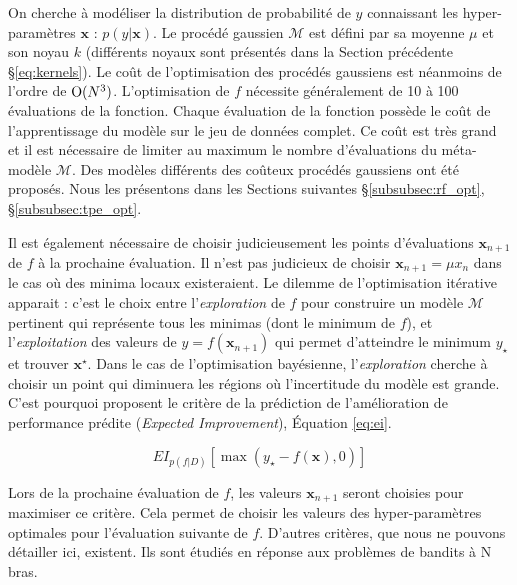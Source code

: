 On cherche à modéliser la distribution de probabilité de $y$ connaissant les hyper-paramètres $\boldsymbol{x}$ : $p(y | \boldsymbol{x})$.
Le procédé gaussien $\mathcal{M}$ est défini par sa moyenne $\mu$ et son noyau $k$ (différents noyaux sont présentés dans la Section précédente §\ref{eq:kernels}).
Le coût de l'optimisation des procédés gaussiens est néanmoins de l'ordre de $\operatorname{O}(N^3)$.
L'optimisation de $f$ nécessite généralement de 10 à 100 évaluations de la fonction.
Chaque évaluation de la fonction possède le coût de l'apprentissage du modèle sur le jeu de données complet.
Ce coût est très grand et il est nécessaire de limiter au maximum le nombre d'évaluations du méta-modèle $\mathcal{M}$.
Des modèles différents des coûteux procédés gaussiens ont été proposés.
Nous les présentons dans les Sections suivantes §\ref{subsubsec:rf_opt}, §\ref{subsubsec:tpe_opt}.

Il est également nécessaire de choisir judicieusement les points d'évaluations $\boldsymbol{x}_{n+1}$ de $f$ à la prochaine évaluation.
Il n'est pas judicieux de choisir $\boldsymbol{x}_{n+1} = \mu{x_{n}}$ dans le cas où des minima locaux existeraient.
Le dilemme de l'optimisation itérative apparait : c'est le choix entre l'\textit{exploration} de $f$ pour construire un modèle $\mathcal{M}$ pertinent qui représente tous les minimas (dont le minimum de $f$), et l'\textit{exploitation} des valeurs de $y = f(\boldsymbol{x}_{n+1})$ qui permet d'atteindre le minimum $y_{\star}$ et trouver $\boldsymbol{x}^{\star}$.
Dans le cas de l'optimisation bayésienne, l'\textit{exploration} cherche à choisir un point qui diminuera les régions où l'incertitude du modèle est grande.
C'est pourquoi \citeauthor{jones_efficient_1998} \cite{jones_efficient_1998} proposent le critère de la prédiction de l'amélioration de performance prédite (\textit{Expected Improvement}), Équation \ref{eq:ei}.

\begin{equation} \label{eq:ei}
{EI}_{p(f | D)}\left[\max \left(y_{\star}-f(\boldsymbol{x}), 0\right)\right]
\end{equation}

Lors de la prochaine évaluation de $f$, les valeurs $\boldsymbol{x}_{n+1}$ seront choisies pour maximiser ce critère.
Cela permet de choisir les valeurs des hyper-paramètres optimales pour l'évaluation suivante de $f$.
D'autres critères, que nous ne pouvons détailler ici, existent.
Ils sont étudiés en réponse aux problèmes de bandits à N bras.

